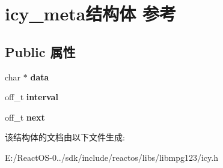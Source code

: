 \hypertarget{structicy__meta}{}\section{icy\+\_\+meta结构体 参考}
\label{structicy__meta}
\subsection*{Public 属性}
\begin{DoxyCompactItemize}
\item 
\mbox{\label{structicy__meta_a249d7dba68898e444c29170bd255d075}} 
char $\ast$ {\bfseries data}
\item 
\mbox{\label{structicy__meta_a0cca288189617bc02425c9be608c57db}} 
off\+\_\+t {\bfseries interval}
\item 
\mbox{\label{structicy__meta_a3f59a92b940b4638c523e40f17afd980}} 
off\+\_\+t {\bfseries next}
\end{DoxyCompactItemize}


该结构体的文档由以下文件生成\+:\begin{DoxyCompactItemize}
\item 
E\+:/\+React\+O\+S-\/0../sdk/include/reactos/libs/libmpg123/icy.\+h\end{DoxyCompactItemize}

